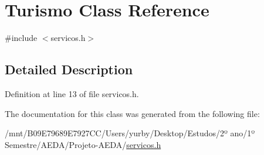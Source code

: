 \hypertarget{classTurismo}{}\section{Turismo Class Reference}
\label{classTurismo}


{\ttfamily \#include $<$servicos.\+h$>$}



\subsection{Detailed Description}


Definition at line 13 of file servicos.\+h.



The documentation for this class was generated from the following file\+:\begin{DoxyCompactItemize}
\item 
/mnt/\+B09\+E79689\+E7927\+C\+C/\+Users/yurby/\+Desktop/\+Estudos/2º ano/1º Semestre/\+A\+E\+D\+A/\+Projeto-\/\+A\+E\+D\+A/\hyperlink{servicos_8h}{servicos.\+h}\end{DoxyCompactItemize}

